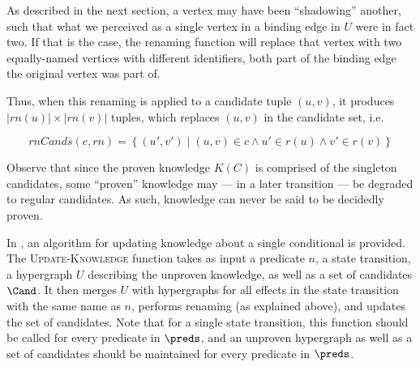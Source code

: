 \documentclass[\master/Master.tex]{subfiles}
\begin{document}
As described in the next section, a vertex may have been ``shadowing'' another, such that what we perceived as a single vertex in a binding edge in $U$ were in fact two. If that is the case, the renaming function will replace that vertex with two equally-named vertices with different identifiers, both part of the binding edge the original vertex was part of. 

Thus, when this renaming is applied to a candidate tuple $(u,v)$, it produces $|rn(u)| \times |rn(v)|$ tuples, which replaces $(u,v)$ in the candidate set, i.e.\ 

\begin{equation*}
    rnCands(c, rn) =
    \left\{ 
        \left( u', v' \right) \mid 
        (u, v) \in c \land u' \in r(u) \land v' \in r(v) 
    \right\}
\end{equation*}

Observe that since the proven knowledge $K(C)$ is comprised of the singleton candidates, some ``proven'' knowledge may --- in a later transition --- be degraded to regular candidates. As such, knowledge can never be said to be decidedly proven.

%


In , an algorithm for updating knowledge about a single conditional is provided. The \textsc{Update-Knowledge} function takes as input a predicate $n$, a state transition, a hypergraph $U$ describing the unproven knowledge, as well as a set of candidates $\Cand$. It then merges $U$ with hypergraphs for all effects in the state transition with the same name as $n$, performs renaming (as explained above), and updates the set of candidates. Note that for a single state transition, this function should be called for every predicate in $\preds$, and an unproven hypergraph as well as a set of candidates should be maintained for every predicate in $\preds$.
\end{document}
